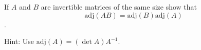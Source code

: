 
\begin{Exercise}[
name={},
title={}, 
difficulty=0,
origin={\cite{BS}}]
If $A$ and $B$ are invertible matrices of the same size show that
\[
\text{adj}\left(AB\right)=\text{adj}\left(B\right)\text{adj}\left(A\right)
\].
\end{Exercise}

\begin{Answer}
Hint: Use $\text{adj}\left(A\right)=\left(\det A\right)A^{-1}$.
\end{Answer}
